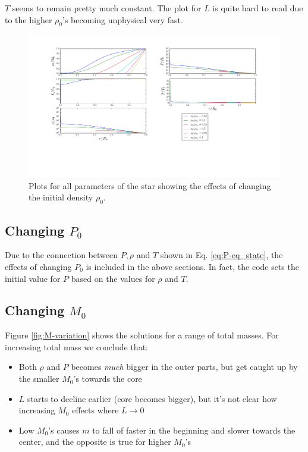 \documentclass[11pt,twocolumn]{article}
\begin{document}
$T$ seems to remain pretty much constant. The plot for $L$ is quite
hard to read due to the higher $\rho_{0}$'s becoming unphysical very
fast. 

\begin{figure}[ht]
  \centering
  \includegraphics[width=\linewidth]{fig/rho_variation.png}
  \caption{\label{fig:rho-variation} Plots for all parameters of the star
  showing the effects of changing the initial density $\rho_0$.}
\end{figure}

\subsection{Changing $P_0$}
Due to the connection between $P,\rho$ and $T$ shown in
Eq. \eqref{eq:P-eq_state}, the effects of changing $P_0$ is included
in the above sections. In fact, the code sets the initial value for
$P$ based on the values for $\rho$ and $T$.  


\subsection{Changing $M_0$}
Figure \ref{fig:M-variation} shows the solutions for a range of total
masses. For increasing total mass we conclude that:

\begin{itemize}
  \item Both $\rho$ and $P$ becomes \emph{much} bigger in the outer
    parts, but get caught up by the smaller $M_0$'s towards the core
  \item $L$ starts to decline earlier (core becomes bigger), but it's
    not clear how increasing $M_0$ effects where $L\rightarrow 0$
  \item Low $M_0$'s causes $m$ to fall of faster in the beginning and
    slower towards the center, and the opposite is true for higher $M_0$'s
\end{itemize}
\end{document}
